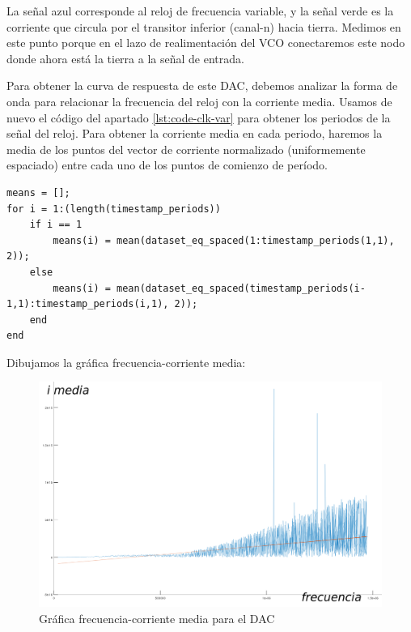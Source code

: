 \documentclass[12pt]{report} %
\begin{document}
	La señal azul corresponde al reloj de frecuencia variable, y la señal verde es la corriente que circula por el transitor inferior (canal-n) hacia tierra. Medimos en este punto porque en el lazo de realimentación del VCO conectaremos este nodo donde ahora está la tierra a la señal de entrada.
	
	Para obtener la curva de respuesta de este DAC, debemos analizar la forma de onda para relacionar la frecuencia del reloj con la corriente media. Usamos de nuevo el código del apartado \ref{lst:code-clk-var} para obtener los periodos de la señal del reloj. Para obtener la corriente media en cada periodo, haremos la media de los puntos del vector de corriente normalizado (uniformemente espaciado) entre cada uno de los puntos de comienzo de período.
	
\begin{lstlisting}[caption={Código en Matlab/Octave para el cálculo de la corriente media por cada periodo}, label={code-dac-i-mean}]
means = [];
for i = 1:(length(timestamp_periods))
	if i == 1
		means(i) = mean(dataset_eq_spaced(1:timestamp_periods(1,1), 2));
	else
		means(i) = mean(dataset_eq_spaced(timestamp_periods(i-1,1):timestamp_periods(i,1), 2));
	end
end
\end{lstlisting}

	Dibujamos la gráfica frecuencia-corriente media:
	
	\begin{figure}[H]
		\includegraphics[width=1\textwidth]{dac-sim-graph.png}
		\caption[Gráfica frecuencia-corriente media para el DAC]{Gráfica frecuencia-corriente media para el DAC}
		\label{fig:dac-sim-graph.png}
	\end{figure}
\end{document}
